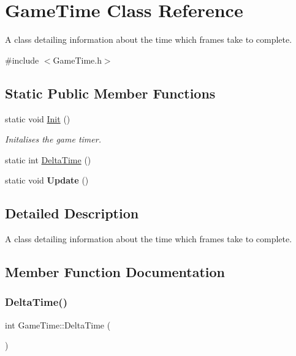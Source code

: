 \hypertarget{class_game_time}{}\section{Game\+Time Class Reference}
\label{class_game_time}


A class detailing information about the time which frames take to complete.  




{\ttfamily \#include $<$Game\+Time.\+h$>$}

\subsection*{Static Public Member Functions}
\begin{DoxyCompactItemize}
\item 
static void \hyperlink{class_game_time_a1f310e807ddb53d1a1278c4a0a2785ed}{Init} ()
\begin{DoxyCompactList}\small\item\em Initalises the game timer. \end{DoxyCompactList}\item 
static int \hyperlink{class_game_time_a2108b642689adae6830b9e8c9c04b535}{Delta\+Time} ()
\item 
\mbox{\label{class_game_time_a2d9927ce7e6cf48da7e8b48a4f1b917f}} 
static void {\bfseries Update} ()
\end{DoxyCompactItemize}


\subsection{Detailed Description}
A class detailing information about the time which frames take to complete. 



\subsection{Member Function Documentation}
\mbox{\label{class_game_time_a2108b642689adae6830b9e8c9c04b535}} 
\subsubsection{\texorpdfstring{Delta\+Time()}{DeltaTime()}}
{\footnotesize\ttfamily int Game\+Time\+::\+Delta\+Time (\begin{DoxyParamCaption}{ }\end{DoxyParamCaption})\hspace{0.3cm}{\ttfamily [static]}}





